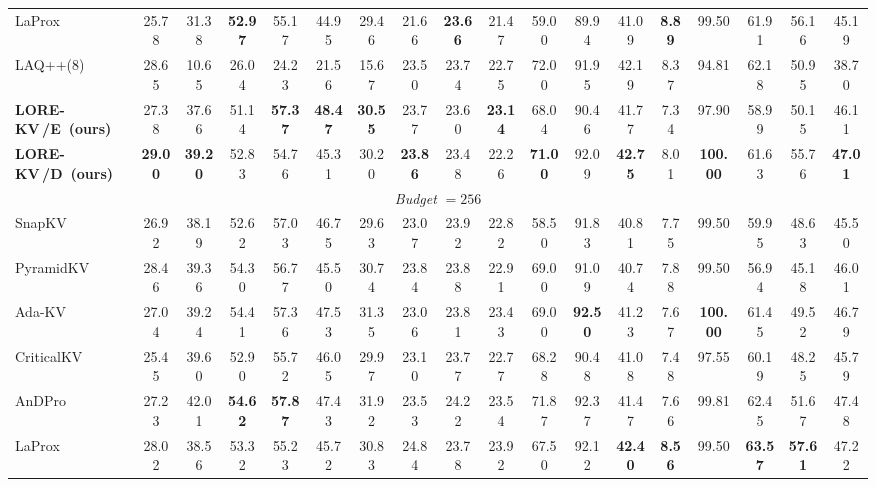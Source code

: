 \documentclass{article} %
\newcommand{\best}[1]{\textcolor{bestblue}{\textbf{#1}}}
\newcommand{\second}[1]{\textcolor{secondorange}{#1}}
\newcommand{\lorekvE}{LORE-KV\,/E}
\newcommand{\lorekvD}{LORE-KV\,/D}
\begin{document}
\begin{table}[t]
{\begin{tabular}{lccccccccccccccccc}
LaProx
& 25.78 & 31.38 & \best{52.97} & 55.17 & 44.95 & 29.46
& 21.66 & \best{23.66} & 21.47 & 59.00 & 89.94 & 41.09
& \best{8.89} & \second{99.50} & \second{61.91}
& \second{56.16} & 45.19 \\

LAQ++(8)
& 28.65 & 10.65 & 26.04 & 24.23 & 21.56 & 15.67
& 23.50 & 23.74 & 22.75 & 72.00 & 91.95 & 42.19
& 8.37 & 94.81 & 62.18 & 50.95 & 38.70 \\

\textbf{\lorekvE\ (ours)}
& 27.38 & \second{37.66} & 51.14 & \best{57.37}
& \best{48.47} & \best{30.55} & \second{23.77}
& \second{23.60} & \best{23.14} & 68.04 & 90.46
& \second{41.77} & 7.34 & 97.90 & 58.99 & 50.15
& \second{46.11} \\

\textbf{\lorekvD\ (ours)}
& \best{29.00} & \best{39.20} & 52.83 & 54.76 & 45.31
& 30.20 & \best{23.86} & 23.48 & \second{22.26}
& \best{71.00} & \second{92.09} & \best{42.75}
& \second{8.01} & \best{100.00} & 61.63 & 55.76
& \best{47.01} \\


\midrule
\multicolumn{18}{c}{\textit{Budget} $=256$} \\
\midrule
SnapKV
& 26.92 & 38.19 & 52.62 & 57.03 & 46.75 & 29.63
& 23.07 & 23.92 & 22.82 & 58.50 & 91.83 & 40.81
& 7.75 & 99.50 & 59.95 & 48.63 & 45.50 \\

PyramidKV
& \second{28.46} & 39.36 & 54.30 & 56.77 & 45.50
& 30.74 & 23.84 & 23.88 & 22.91 & 69.00 & 91.09 & 40.74
& \second{7.88} & 99.50 & 56.94 & 45.18 & 46.01 \\

Ada-KV
& 27.04 & 39.24 & \second{54.41} & 57.36
& \second{47.53} & 31.35 & 23.06 & 23.81 & 23.43
& 69.00 & \best{92.50} & 41.23 & 7.67
& \best{100.00} & 61.45 & 49.52 & 46.79 \\

CriticalKV
& 25.45 & 39.60 & 52.90 & 55.72 & 46.05 & 29.97
& 23.10 & 23.77 & 22.77 & 68.28 & 90.48 & 41.08
& 7.48 & 97.55 & 60.19 & 48.25 & 45.79 \\

AnDPro
& 27.23 & 42.01 & \best{54.62} & \best{57.87}
& 47.43 & 31.92 & 23.53 & 24.22 & 23.54
& \second{71.87} & \second{92.37} & \second{41.47}
& 7.66 & \second{99.81} & 62.45 & 51.67 & 47.48 \\

LaProx
& 28.02 & 38.56 & 53.32 & 55.23 & 45.72 & 30.83
& 24.84 & 23.78 & \second{23.92} & 67.50 & 92.12
& \best{42.40} & \best{8.56} & 99.50
& \best{63.57} & \best{57.61} & 47.22 \\


\end{tabular}}
\end{table}
\end{document}

